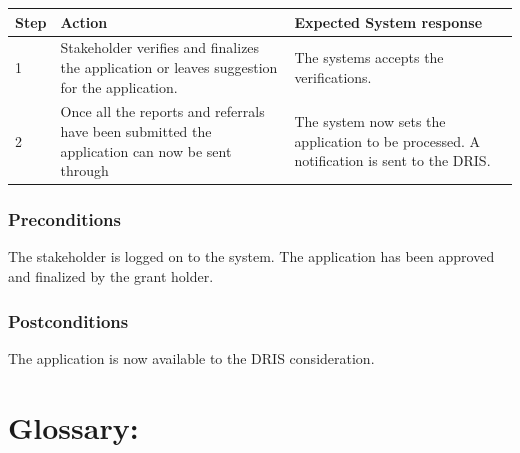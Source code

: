 \documentclass[12pt]{article}
\begin{document}
\begin{center}
\begin{tabular}{|l|p{6cm}|p{8cm}|}
\hline
Step & Action & Expected System response \\
\hline
1 & Stakeholder verifies and finalizes the application or leaves suggestion for the application. & The systems accepts the verifications. \\
\hline
2 & Once all the reports and referrals have been submitted the application can now be sent through  & The system now sets the application to be processed. A notification is sent to the DRIS. \\
\hline
\end{tabular}
\end{center}

\subsubsection*{Preconditions}
The stakeholder is logged on to the system. The application has been approved and finalized by the grant holder.

\subsubsection*{Postconditions}
The application is now available to the DRIS consideration.

\section{Glossary:}
\vspace{0.2in}
\end{document}
